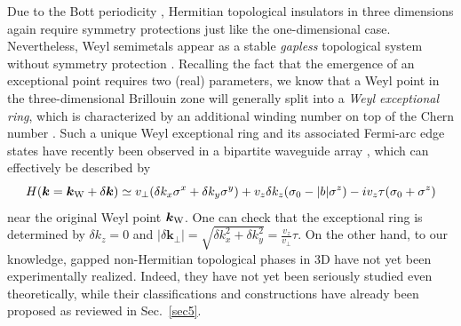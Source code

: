 \documentclass{tADP2e}
\theoremstyle{plain}
\theoremstyle{plain}
\theoremstyle{definition}
\begin{document}
Due to the Bott periodicity \cite{AK09}, Hermitian topological insulators in three dimensions again require symmetry protections just like the one-dimensional case. Nevertheless, Weyl semimetals appear as a stable \emph{gapless} topological system without symmetry protection \cite{ANP18}. Recalling the fact that the emergence of an exceptional point requires two (real) parameters, we know that a Weyl point in the three-dimensional Brillouin zone will generally split into a \emph{Weyl exceptional ring}, which is characterized by an additional winding number on top of the Chern number \cite{XY17}. Such a unique Weyl exceptional ring and its associated Fermi-arc edge states have recently been observed in a bipartite waveguide array \cite{AC19}, which can effectively be described by 
\begin{equation}
H(\boldsymbol{k}=\boldsymbol{k}_{\rm W}+\delta\boldsymbol{k})\simeq v_{\perp}(\delta k_x\sigma^x+\delta k_y\sigma^y)+v_z\delta k_z(\sigma_0-|b|\sigma^z)-iv_z\tau(\sigma_0+\sigma^z)
\label{EWR}
\end{equation}
near the original Weyl point $\boldsymbol{k}_{\rm W}$. One can check that the exceptional ring is determined by $\delta k_z=0$ and $|\delta\boldsymbol{k}_\perp|=\sqrt{\delta k_x^2+\delta k_y^2}=\frac{v_z}{v_\perp}\tau$. On the other hand, to our knowledge, gapped non-Hermitian topological phases in 3D have not yet been experimentally realized. Indeed, they have not yet been seriously studied even theoretically, while their classifications and constructions have already been proposed as reviewed in Sec.~\ref{sec5}. 
\end{document}
